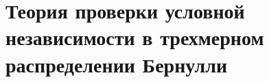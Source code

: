 \documentclass[a4paper,14pt]{extarticle}
\theoremstyle{definition}
\begin{document}

\newpage

\tableofcontents
\newpage
\section{Теория проверки условной независимости в трехмерном распределении Бернулли}




% 



\newpage
\printbibliography
\end{document}

